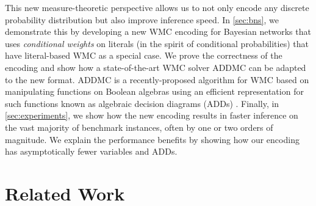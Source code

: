 \documentclass{article}
\begin{document}
This new measure-theoretic perspective allows us to not only encode any
discrete probability distribution but also improve inference speed. In
\cref{sec:bns}, we demonstrate this by developing a new WMC encoding for
Bayesian networks that uses \emph{conditional weights} on literals (in the
spirit of conditional probabilities) that have literal-based WMC as a special
case. We prove the correctness of the encoding and show how a state-of-the-art
WMC solver ADDMC \cite{DBLP:conf/aaai/DudekPV20} can be adapted to the new
format. ADDMC is a recently-proposed algorithm for WMC based on manipulating
functions on Boolean algebras using an efficient representation for such
functions known as algebraic decision diagrams (ADDs)
\cite{DBLP:journals/fmsd/BaharFGHMPS97}. Finally, in \cref{sec:experiments}, we
show how the new encoding results in faster inference on the vast majority of
benchmark instances, often by one or two orders of magnitude. We explain the
performance benefits by showing how our encoding has asymptotically fewer
variables and ADDs.



\section{Related Work} \label{sec:related}
\end{document}
